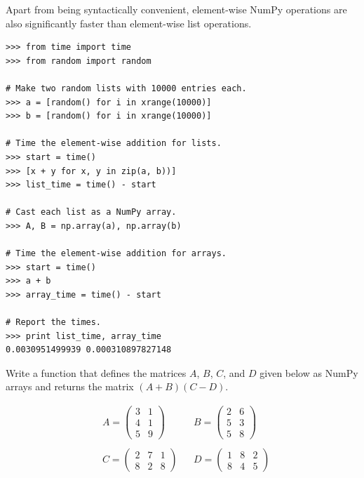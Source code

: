 Apart from being syntactically convenient, element-wise NumPy operations are also significantly faster than element-wise list operations.

\begin{lstlisting}
>>> from time import time
>>> from random import random

# Make two random lists with 10000 entries each.
>>> a = [random() for i in xrange(10000)]
>>> b = [random() for i in xrange(10000)]

# Time the element-wise addition for lists.
>>> start = time()
>>> [x + y for x, y in zip(a, b))]
>>> list_time = time() - start

# Cast each list as a NumPy array.
>>> A, B = np.array(a), np.array(b)

# Time the element-wise addition for arrays.
>>> start = time()
>>> a + b
>>> array_time = time() - start

# Report the times.
>>> print list_time, array_time
0.0030951499939 0.000310897827148
\end{lstlisting}

\begin{problem}
Write a function that defines the matrices $A$, $B$, $C$, and $D$ given below as NumPy arrays and returns the matrix $(A + B)(C - D)$.

\begin{align*}
&A = \left(\begin{array}{rr}
3 & 1 \\ 
4 & 1 \\
5 & 9 \end{array}\right)
&&
B = \left(\begin{array}{rr}
2 & 6 \\ 
5 & 3 \\
5 & 8 \end{array}\right)
\\ \\
&C = \left(\begin{array}{rrr}
2 & 7 & 1 \\ 
8 & 2 & 8 \end{array}\right)
&&
D = \left(\begin{array}{rrr}
1 & 8 & 2 \\ 
8 & 4 & 5 \end{array}\right)
\end{align*}
\label{prob:simple_equation}
\end{problem}

